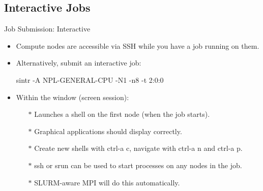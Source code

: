 \subsection{Interactive Jobs}
\begin{frame}[fragile]{Job Submission: Interactive}
\begin{itemize}
\item{Compute nodes are accessible via SSH \alert{while you have a job running on them}.}
\pause
\item{Alternatively, submit an interactive job:}
\begin{semiverbatim}
\alert{sintr -A NPL-GENERAL-CPU -N1 -n8 -t 2:0:0}
\end{semiverbatim}
\medskip
\pause
\item{Within the window (screen session):}
\begin{itemize}
\item[$\ast$]{Launches a shell on the first node (when the job starts).}
\item[$\ast$]{Graphical applications should display correctly.}
\item[$\ast$]{Create new shells with \alert{ctrl-a c}, navigate with \alert{ctrl-a n} and \alert{ctrl-a p}.}
\item[$\ast$]{\alert{ssh} or \alert{srun} can be used to start processes on any nodes in the job.}
\item[$\ast$]{SLURM-aware MPI will do this automatically.}
\end{itemize}
\end{itemize}
\end{frame}


